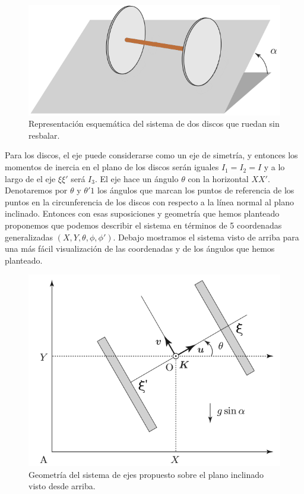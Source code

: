 \documentclass[a4paper,10pt]{article}
\numberwithin{equation}{section}
\begin{document}
\begin{figure}[H]
 \center
 \includegraphics[scale=0.4]{problema1fig1}
 \caption{Representación esquemática del sistema de dos discos que ruedan sin resbalar.}
 \label{fig:problema1fig1}
\end{figure}

Para los discos, el eje puede considerarse como un eje de simetría, y entonces los 
momentos de inercia en el plano de los discos serán iguales $I_1 = I_2 = I$ y a lo 
largo de el eje $\xi\xi'$ será $I_3$. El eje hace un ángulo $\theta$ con la horizontal 
$XX'$. Denotaremos por $\theta$ y $\theta'1$ los ángulos que marcan los puntos de 
referencia de los puntos en la circunferencia de los discos con respecto a la línea 
normal al plano inclinado. Entonces con esas suposiciones y geometría que hemos 
planteado proponemos que podemos describir el sistema en términos de 5 coordenadas 
generalizadas $(X,Y,\theta,\phi,\phi')$. Debajo mostramos el sistema visto de arriba 
para una más fácil visualización de las coordenadas y de los ángulos que hemos 
planteado.

\begin{figure}[H]
 \center
 \includegraphics[scale=0.4]{problema1fig2}
 \caption{Geometría del sistema de ejes propuesto sobre el plano inclinado visto desde 
 arriba.}
 \label{fig:problema1fig2}
\end{figure}
\end{document}

